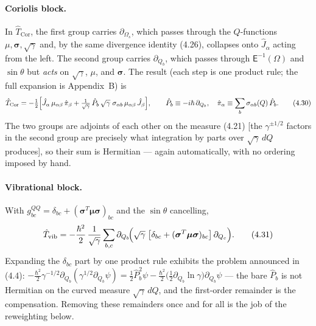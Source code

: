 \paragraph{Coriolis block.}
In $\hat T_{\mathrm{Cor}}$, the first group carries $\partial_{\Omega_s}$, which passes through the $Q$-functions $\mu,\boldsymbol\sigma,\sqrt\gamma$ and, by the same divergence identity (4.26), collapses onto $\hat J_\alpha$ acting from the left. The second group carries $\partial_{Q_b}$, which passes through $\mathsf E^{-1}(\Omega)$ and $\sin\theta$ but \emph{acts} on $\sqrt\gamma$, $\mu$, and $\boldsymbol\sigma$. The result (each step is one product rule; the full expansion is Appendix~B) is
\begin{equation}
\hat T_{\mathrm{Cor}}
=-\tfrac12\Bigl[\hat J_\alpha\,\mu_{\alpha\beta}\,\hat\pi_\beta
+\tfrac{1}{\sqrt\gamma}\,\hat P_b\,\sqrt\gamma\;\sigma_{\alpha b}\,\mu_{\alpha\beta}\,\hat J_\beta\Bigr],
\qquad
\hat P_b\equiv-i\hbar\,\partial_{Q_b},\quad
\hat\pi_\alpha\equiv\sum_b\sigma_{\alpha b}(Q)\,\hat P_b . \tag{4.30}
\end{equation}
The two groups are adjoints of each other on the measure (4.21) [the $\gamma^{\pm1/2}$ factors in the second group are precisely what integration by parts over $\sqrt\gamma\,dQ$ produces], so their sum is Hermitian --- again automatically, with no ordering imposed by hand.

\paragraph{Vibrational block.}
With $g^{QQ}_{bc}=\delta_{bc}+(\boldsymbol\sigma^{T}\boldsymbol\mu\boldsymbol\sigma)_{bc}$ and the $\sin\theta$ cancelling,
\begin{equation}
\hat T_{\mathrm{vib}}
=-\frac{\hbar^{2}}{2}\,\frac{1}{\sqrt\gamma}\sum_{b,c}\partial_{Q_b}\!\Bigl(\sqrt\gamma\;\bigl[\delta_{bc}+(\boldsymbol\sigma^{T}\boldsymbol\mu\boldsymbol\sigma)_{bc}\bigr]\,\partial_{Q_c}\Bigr). \tag{4.31}
\end{equation}
Expanding the $\delta_{bc}$ part by one product rule exhibits the problem announced in (4.4): $-\tfrac{\hbar^2}{2}\gamma^{-1/2}\partial_{Q_b}(\gamma^{1/2}\partial_{Q_b}\psi)=\tfrac12\hat P_b^2\psi-\tfrac{\hbar^2}{2}\bigl(\tfrac12\partial_{Q_b}\ln\gamma\bigr)\partial_{Q_b}\psi$ --- the bare $\hat P_b$ is not Hermitian on the curved measure $\sqrt\gamma\,dQ$, and the first-order remainder is the compensation. Removing these remainders once and for all is the job of the reweighting below.

